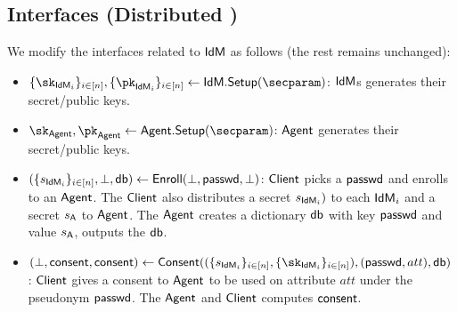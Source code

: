 \subsection{Interfaces (Distributed \idm)}
We modify the interfaces related to $\textsf{IdM}$ as follows (the rest remains unchanged):

\begin{itemize}
    \item  $\idmskdist, \idmpkdist \gets \idm.\mathsf{Setup(\secparam)}$: $\textsf{IdM}$s generates their secret/public keys.
    \item $\sk_\signserv, \pk_\signserv \gets \signserv.\mathsf{Setup}(\secparam)$:  $\textsf{Agent}$ generates their secret/public keys.

    \item $(\{s_{\textsf{IdM}_i}\}_{i \in [n]}, \bot, \mathsf{db}) \gets \mathsf{Enroll}(\bot, \textsf{passwd}, \bot)$: $\textsf{Client}$ picks a $\textsf{passwd}$ and enrolls to an $\textsf{Agent}$. The $\textsf{Client}$ also distributes a secret $s_{\textsf{IdM}_i})$ to each $\textsf{IdM}_i$ and a secret $s_\mathsf{A}$ to $\textsf{Agent}$. The $\textsf{Agent}$ creates a dictionary $\mathsf{db}$ with key $\textsf{passwd}$ and value $s_\mathsf{A}$, outputs the $\mathsf{db}$.

    \item $(\bot, \consent, \consent) \gets \mathsf{Consent}((\idmsdist, \idmskdist), (\pseudo, att), \dict)$: $\textsf{Client}$ gives a consent to $\textsf{Agent}$ to be used on attribute $att$ under the pseudonym $\textsf{passwd}$. The $\textsf{Agent}$ and $\textsf{Client}$ computes $\mathsf{consent}$.
\end{itemize}

